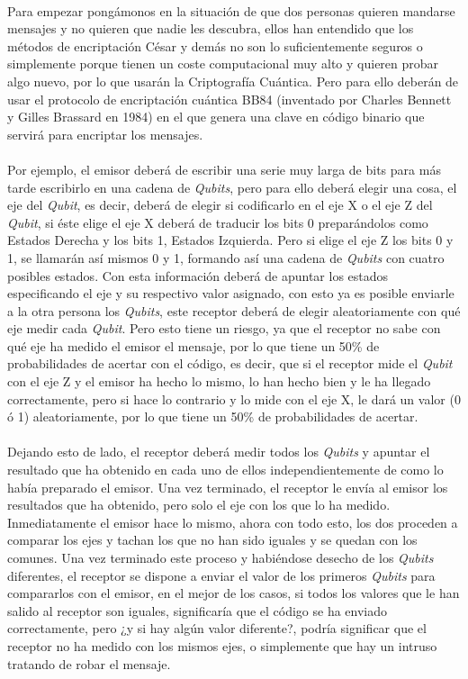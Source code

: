\documentclass[12pt,a4paper]{book}
\theoremstyle{change}
\begin{document}
	\vspace{5mm}\\
	Para empezar pongámonos en la situación de que dos personas quieren mandarse mensajes y no quieren que nadie les descubra, ellos han entendido que los métodos de encriptación César y demás no son lo suficientemente seguros o simplemente porque tienen un coste computacional muy alto y quieren probar algo nuevo, por lo que usarán la Criptografía Cuántica. Pero para ello deberán de usar el protocolo de encriptación cuántica BB84 (inventado por Charles Bennett y Gilles Brassard en 1984) en el que genera una clave en código binario que servirá para encriptar los mensajes.\\
	\vspace{5mm}\\
	Por ejemplo, el emisor deberá de escribir una serie muy larga de bits para más tarde escribirlo en una cadena de \textit{Qubits}, pero para ello deberá elegir una cosa, el eje del \textit{Qubit}, es decir, deberá de elegir si codificarlo en el eje X o el eje Z del \textit{Qubit}, si éste elige el eje X deberá de traducir los bits 0 preparándolos como Estados Derecha y los bits 1, Estados Izquierda. Pero si elige el eje Z los bits 0 y 1, se llamarán así mismos 0 y 1, formando así una cadena de \textit{Qubits} con cuatro posibles estados. Con esta información deberá de apuntar los estados especificando el eje y su respectivo valor asignado, con esto ya es posible enviarle a la otra persona los \textit{Qubits}, este receptor deberá de elegir aleatoriamente con qué eje medir cada \textit{Qubit}. Pero esto tiene un riesgo, ya que el receptor no sabe con qué eje ha medido el emisor el mensaje, por lo que tiene un 50\% de probabilidades de acertar con el código, es decir, que si el receptor mide el \textit{Qubit} con el eje Z y el emisor ha hecho lo mismo, lo han hecho bien y le ha llegado correctamente, pero si hace lo contrario y lo mide con el eje X, le dará un valor (0 ó 1) aleatoriamente, por lo que tiene un 50\% de probabilidades de acertar.\\
	\vspace{5mm}\\
	Dejando esto de lado, el receptor deberá medir todos los \textit{Qubits} y apuntar el resultado que ha obtenido en cada uno de ellos independientemente de como lo había preparado el emisor. Una vez terminado, el receptor le envía al emisor los resultados que ha obtenido, pero solo el eje con los que lo ha medido. Inmediatamente el emisor hace lo mismo, ahora con todo esto, los dos proceden a comparar los ejes y tachan los que no han sido iguales y se quedan con los comunes. Una vez terminado este proceso y habiéndose desecho de los \textit{Qubits} diferentes, el receptor se dispone a enviar el valor de los primeros \textit{Qubits} para compararlos con el emisor, en el mejor de los casos, si todos los valores que le han salido al receptor son iguales, significaría que el código se ha enviado correctamente, pero ¿y si hay algún valor diferente?, podría significar que el receptor no ha medido con los mismos ejes, o simplemente que hay un intruso tratando de robar el mensaje.\\
\end{document}
